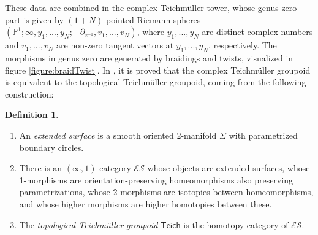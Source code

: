 \documentclass[11pt]{report}
\theoremstyle{definition}
\newtheorem{definition}[theorem]{Definition}
\theoremstyle{remark}
\theoremstyle{remark}
\renewcommand{\P}{\mathbb{P}}
\begin{document}
These data are combined in the complex Teichmüller tower, whose genus zero part is given by $(1+N)$-pointed Riemann spheres $(\P^1;\infty,y_1,...,y_N;-\partial_{z^{-1}},v_1,...,v_N)$, where $y_1,...,y_N$ are distinct complex numbers and $v_1,...,v_N$ are non-zero tangent vectors at $y_1,...,y_N$, respectively. The morphisms in genus zero are generated by braidings and twists, visualized in figure \ref{figure:braidTwist}. In \cite{book:bakalov}, it is proved that the complex Teichmüller groupoid is equivalent to the topological Teichmüller groupoid, coming from the following construction:

\begin{definition}
\begin{enumerate}[label=(\roman*)]
\item An \emph{extended surface} is a smooth oriented 2-manifold $\Sigma$ with parametrized boundary circles.
\item There is an $(\infty,1)$-category $\mathcal{ES}$ whose objects are extended surfaces, whose 1-morphisms are orientation-preserving homeomorphisms also preserving parametrizations, whose 2-morphisms are isotopies between homeomorphisms, and whose higher morphisms are higher homotopies between these.
\item The \emph{topological Teichmüller groupoid} $\mathsf{Teich}$ is the homotopy category of $\mathcal{ES}$.
\end{enumerate}
\end{definition}
\end{document}
